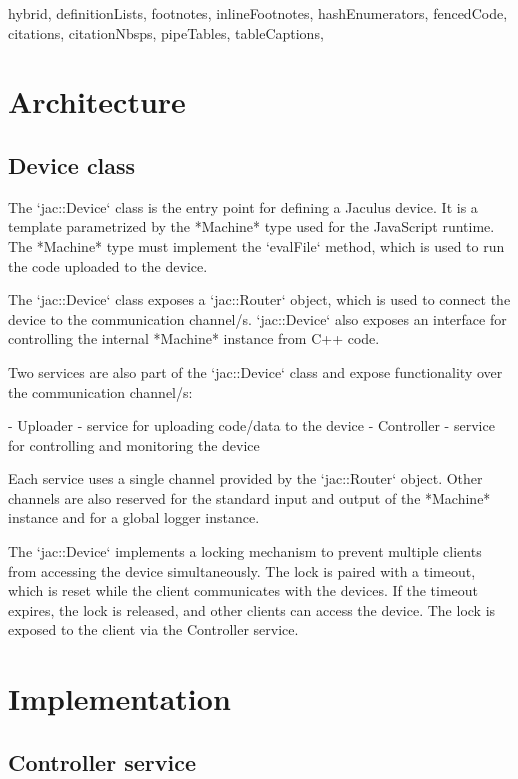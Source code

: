 \documentclass[
  digital,
  oneside,
  nosansbold,
  nocolorbold,
  lof,
  lot
]{fithesis4}
\begin{document}
\begin{markdown*}{%
  hybrid,
  definitionLists,
  footnotes,
  inlineFootnotes,
  hashEnumerators,
  fencedCode,
  citations,
  citationNbsps,
  pipeTables,
  tableCaptions,
}

\section{Architecture}

\subsection{Device class}

The `jac::Device` class is the entry point for defining a Jaculus device. It is a template parametrized by the *Machine* type used for the JavaScript runtime. The *Machine* type must implement the `evalFile` method, which is used to run the code uploaded to the device.

The `jac::Device` class exposes a `jac::Router` object, which is used to connect the device to the communication channel/s. `jac::Device` also exposes an interface for controlling the internal *Machine* instance from C++ code.

Two services are also part of the `jac::Device` class and expose functionality over the communication channel/s:

  - Uploader - service for uploading code/data to the device
  - Controller - service for controlling and monitoring the device

Each service uses a single channel provided by the `jac::Router` object. Other channels are also reserved for the standard input and output of the *Machine* instance and for a global logger instance.

The `jac::Device` implements a locking mechanism to prevent multiple clients from accessing the device simultaneously. The lock is paired with a timeout, which is reset while the client communicates with the devices. If the timeout expires, the lock is released, and other clients can access the device. The lock is exposed to the client via the Controller service.


\section{Implementation}

\subsection{Controller service}


\end{markdown*}
\end{document}
